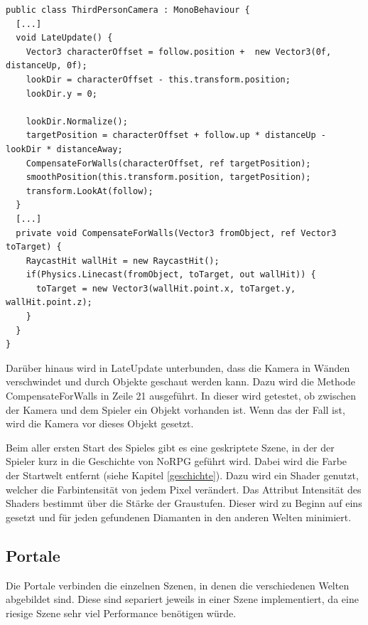 \begin{scriptsize}
\lstset{
	float,
	caption=Skript: ThirdPersonCamera.cs, 
	language=[Sharp]C, 
	frame=single,  
	showstringspaces=false, 
	showspaces=false, 
	numbers=left, 
	captionpos=b, 
	belowcaptionskip=4pt,
	basicstyle=\ttfamily
} 
\begin{lstlisting}[label=lst:lateupdate]
public class ThirdPersonCamera : MonoBehaviour {
  [...]
  void LateUpdate() {
    Vector3 characterOffset = follow.position +  new Vector3(0f, distanceUp, 0f);
    lookDir = characterOffset - this.transform.position;
    lookDir.y = 0;
    
    lookDir.Normalize();
    targetPosition = characterOffset + follow.up * distanceUp - lookDir * distanceAway;
    CompensateForWalls(characterOffset, ref targetPosition);
    smoothPosition(this.transform.position, targetPosition);
    transform.LookAt(follow);
  }
  [...]  
  private void CompensateForWalls(Vector3 fromObject, ref Vector3 toTarget) {
    RaycastHit wallHit = new RaycastHit();
    if(Physics.Linecast(fromObject, toTarget, out wallHit)) {
      toTarget = new Vector3(wallHit.point.x, toTarget.y, wallHit.point.z);
    }
  }
}
\end{lstlisting}
\end{scriptsize}

			Darüber hinaus wird in LateUpdate unterbunden, dass die Kamera in Wänden verschwindet und durch Objekte geschaut werden kann. Dazu wird die Methode CompensateForWalls in Zeile 21 ausgeführt. In dieser wird getestet, ob zwischen der Kamera und dem Spieler ein Objekt vorhanden ist. Wenn das der Fall ist, wird die Kamera vor dieses Objekt gesetzt.

			Beim aller ersten Start des Spieles gibt es eine geskriptete Szene, in der der Spieler kurz in die Geschichte von NoRPG geführt wird. Dabei wird die Farbe der Startwelt entfernt (siehe Kapitel \ref{geschichte}). Dazu wird ein Shader genutzt, welcher die Farbintensität von jedem Pixel verändert. Das Attribut Intensität des Shaders bestimmt über die Stärke der Graustufen. Dieser wird zu Beginn auf eins gesetzt und für jeden gefundenen Diamanten in den anderen Welten minimiert.
    
		\subsection{Portale}
			Die Portale verbinden die einzelnen Szenen, in denen die verschiedenen Welten abgebildet sind. Diese sind separiert jeweils in einer Szene implementiert, da eine riesige Szene sehr viel Performance benötigen würde.
	
